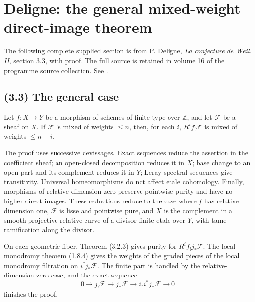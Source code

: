 
\endgroup

\clearpage
\begingroup

\def\Fq{\mathbb F_q}\def\Ql{\mathbb Q_\ell}\def\Spec{\operatorname{Spec}}
\setcounter{equation}{0}
\renewcommand{\theequation}{D33.\arabic{equation}}
\section*{Deligne: the general mixed-weight direct-image theorem}
The following complete supplied section is from P. Deligne, \emph{La conjecture de Weil. II}, section 3.3, with proof. The full source is retained in volume 16 of the programme source collection. See \cite{et:Deligne}.
\subsection*{(3.3) The general case}

\begin{theorem}[3.3.1]
Let $f:X\to Y$ be a morphism of schemes of finite type over $\mathbb Z$, and let $\mathcal F$ be a sheaf on $X$. If $\mathcal F$ is mixed of weights $\le n$, then, for each $i$, $R^if_{!}\mathcal F$ is mixed of weights $\le n+i$.
\end{theorem}

The proof uses successive devissages. Exact sequences reduce the assertion in the coefficient sheaf; an open-closed decomposition reduces it in $X$; base change to an open part and its complement reduces it in $Y$; Leray spectral sequences give transitivity. Universal homeomorphisms do not affect etale cohomology. Finally, morphisms of relative dimension zero preserve pointwise purity and have no higher direct images. These reductions reduce to the case where $f$ has relative dimension one, $\mathcal F$ is lisse and pointwise pure, and $X$ is the complement in a smooth projective relative curve of a divisor finite etale over $Y$, with tame ramification along the divisor.

On each geometric fiber, Theorem (3.2.3) gives purity for $R^if_{!}j_{*}\mathcal F$. The local-monodromy theorem (1.8.4) gives the weights of the graded pieces of the local monodromy filtration on $i^*j_{*}\mathcal F$. The finite part is handled by the relative-dimension-zero case, and the exact sequence
\[
0\to j_{!}\mathcal F\to j_{*}\mathcal F\to i_{*}i^*j_{*}\mathcal F\to0
\]
finishes the proof.

